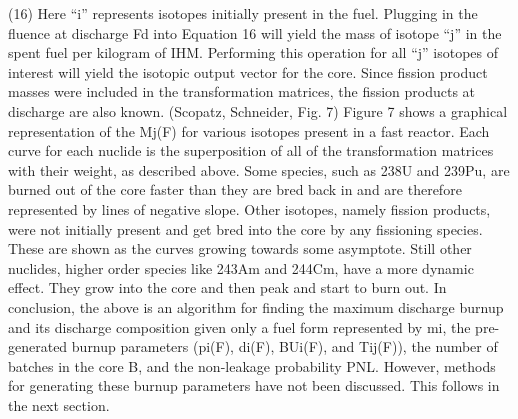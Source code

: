                                  (16)
Here “i” represents isotopes initially present in the fuel.  Plugging in the fluence at discharge Fd into Equation 16 will yield the mass of isotope “j” in the spent fuel per kilogram of IHM.  Performing this operation for all “j” isotopes of interest will yield the isotopic output vector for the core.  Since fission product masses were included in the transformation matrices, the fission products at discharge are also known.  
(Scopatz, Schneider, Fig. 7)
Figure 7 shows a graphical representation of the Mj(F) for various isotopes present in a fast reactor.  Each curve for each nuclide is the superposition of all of the transformation matrices with their weight, as described above.  Some species, such as 238U and 239Pu, are burned out of the core faster than they are bred back in and are therefore represented by lines of negative slope.  Other isotopes, namely fission products, were not initially present and get bred into the core by any fissioning species.  These are shown as the curves growing towards some asymptote.  Still other nuclides, higher order species like 243Am and 244Cm, have a more dynamic effect.  They grow into the core and then peak and start to burn out.  
In conclusion, the above is an algorithm for finding the maximum discharge burnup and its discharge composition given only a fuel form represented by mi, the pre-generated burnup parameters (pi(F), di(F), BUi(F), and Tij(F)), the number of batches in the core B, and the non-leakage probability PNL.  However, methods for generating these burnup parameters have not been discussed.  This follows in the next section. 



